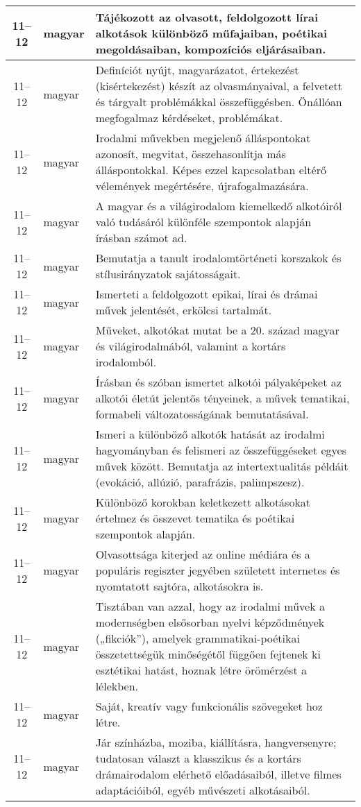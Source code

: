 \begin{small}
\begin{longtable}{c | p{2cm} |  p{11cm} }
              11--12 & magyar & Tájékozott az olvasott, feldolgozott lírai alkotások különböző műfajaiban, poétikai megoldásaiban, kompozíciós eljárásaiban. \\ \hline
              11--12 & magyar & Definíciót nyújt, magyarázatot, értekezést (kisértekezést) készít az olvasmányaival, a felvetett  és tárgyalt problémákkal összefüggésben. Önállóan megfogalmaz kérdéseket, problémákat. \\ \hline
              11--12 & magyar & Irodalmi művekben megjelenő álláspontokat azonosít, megvitat, összehasonlítja más álláspontokkal. Képes ezzel kapcsolatban eltérő vélemények megértésére, újrafogalmazására. \\ \hline
              11--12 & magyar & A magyar és a világirodalom kiemelkedő alkotóiról való tudásáról különféle szempontok alapján írásban számot ad.
 \\ \hline
              11--12 & magyar & Bemutatja a tanult irodalomtörténeti korszakok és stílusirányzatok sajátosságait. \\ \hline
              11--12 & magyar & Ismerteti a feldolgozott epikai, lírai és drámai művek jelentését, erkölcsi tartalmát. \\ \hline
              11--12 & magyar & Műveket, alkotókat mutat be a 20. század magyar és világirodalmából, valamint a kortárs irodalomból. \\ \hline
              11--12 & magyar & Írásban és szóban ismertet alkotói pályaképeket az alkotói életút jelentős tényeinek, a művek tematikai, formabeli változatosságának bemutatásával. \\ \hline
              11--12 & magyar & Ismeri a különböző alkotók hatását az irodalmi hagyományban és felismeri az összefüggéseket egyes művek között. Bemutatja az intertextualitás példáit (evokáció, allúzió, parafrázis, palimpszesz). \\ \hline
              11--12 & magyar & Különböző korokban keletkezett alkotásokat értelmez és összevet tematika és poétikai szempontok alapján. \\ \hline
              11--12 & magyar & Olvasottsága kiterjed az online médiára és a populáris regiszter jegyében született internetes és nyomtatott sajtóra, alkotásokra is. \\ \hline
              11--12 & magyar & Tisztában van azzal, hogy az irodalmi művek a modernségben elsősorban nyelvi képződmények („fikciók”), amelyek grammatikai-poétikai összetettségük minőségétől függően fejtenek ki esztétikai hatást, hoznak létre örömérzést a lélekben. \\ \hline
              11--12 & magyar & Saját, kreatív vagy funkcionális szövegeket hoz létre. \\ \hline
              11--12 & magyar & Jár színházba, moziba, kiállításra, hangversenyre; tudatosan választ a klasszikus és a kortárs drámairodalom elérhető előadásaiból, illetve filmes adaptációiból, egyéb művészeti alkotásaiból. \\ \hline
      \end{longtable}
\end{small}





